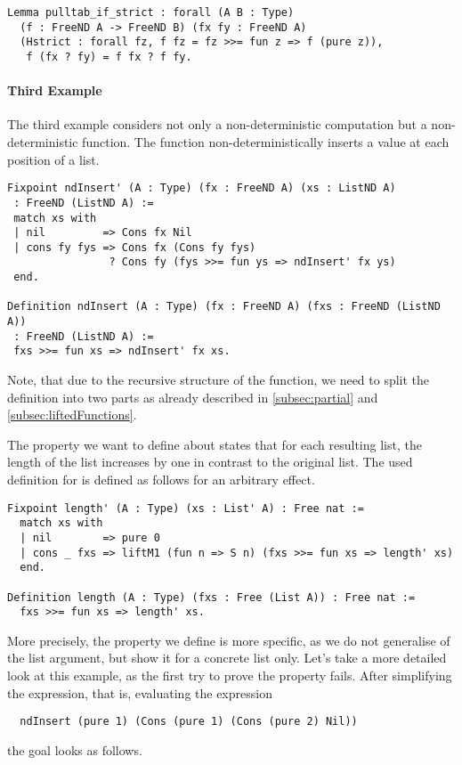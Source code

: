 \begin{verbatim}
Lemma pulltab_if_strict : forall (A B : Type)
  (f : FreeND A -> FreeND B) (fx fy : FreeND A)
  (Hstrict : forall fz, f fz = fz >>= fun z => f (pure z)),
   f (fx ? fy) = f fx ? f fy.
\end{verbatim}


\paragraph{Third Example}
The third example considers not only a non-deterministic computation but a non-deterministic function.
The function  non-deterministically inserts a value at each position of a list.

\begin{verbatim}
Fixpoint ndInsert' (A : Type) (fx : FreeND A) (xs : ListND A)
 : FreeND (ListND A) :=
 match xs with
 | nil         => Cons fx Nil
 | cons fy fys => Cons fx (Cons fy fys)
                ? Cons fy (fys >>= fun ys => ndInsert' fx ys)
 end.

Definition ndInsert (A : Type) (fx : FreeND A) (fxs : FreeND (ListND A))
 : FreeND (ListND A) :=
 fxs >>= fun xs => ndInsert' fx xs.
\end{verbatim}

Note, that due to the recursive structure of the function, we need to split the definition into two parts as already described in \autoref{subsec:partial} and \autoref{subsec:liftedFunctions}.

The property we want to define about  states that for each resulting list, the length of the list increases by one in contrast to the original list.
The used definition for  is defined as follows for an arbitrary effect.

\begin{verbatim}
Fixpoint length' (A : Type) (xs : List' A) : Free nat :=
  match xs with
  | nil        => pure 0
  | cons _ fxs => liftM1 (fun n => S n) (fxs >>= fun xs => length' xs)
  end.

Definition length (A : Type) (fxs : Free (List A)) : Free nat :=
  fxs >>= fun xs => length' xs.
\end{verbatim}
  
More precisely, the property we define is more specific, as we do not generalise of the list argument, but show it for a concrete list only.
Let's take a more detailed look at this example, as the first try to prove the property fails.
After simplifying the expression, that is, evaluating the expression
\begin{verbatim}
  ndInsert (pure 1) (Cons (pure 1) (Cons (pure 2) Nil))
\end{verbatim}
the goal looks as follows.


